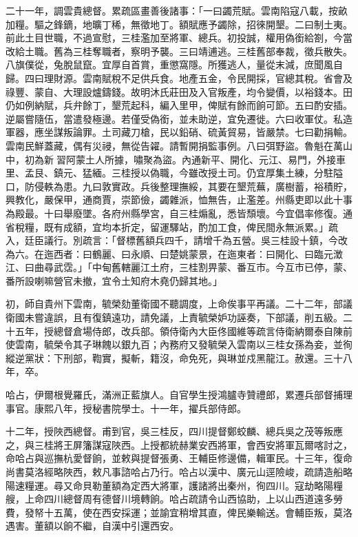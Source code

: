 \begin{pinyinscope}
二十一年，調雲貴總督。累疏區畫善後諸事：「一曰蠲荒賦。雲南陷寇八載，按畝加糧。驅之鋒鏑，地曠丁稀，無徵地丁。額賦應予蠲除，招徠開墾。二曰制土夷。前此土目世職，不過宣慰，三桂濫加至將軍、總兵。初投誠，權用偽銜給劄，今當改給土職。舊為三桂奪職者，察明予襲。三曰靖逋逃。三桂舊部奉裁，徵兵散失。八旗僕從，兔脫鼠竄。宜厚自首賞，重懲窩隱。所獲逃人，量從末減，庶聞風自歸。四曰理財源。雲南賦稅不足供兵食。地產五金，令民開採，官總其稅。省會及祿豐、蒙自、大理設爐鑄錢。故明沐氏莊田及入官叛產，均令變價，以裕錢本。田仍如例納賦，兵弁餘丁，墾荒起科，編入里甲，俾賦有餘而餉可節。五曰酌安插。逆屬嘗隨伍，當遣發極邊。若僅受偽銜，並未助逆，宜免遷徙。六曰收軍仗。私造軍器，應坐謀叛論罪。土司藏刀槍，民以鉛硝、硫黃貿易，皆嚴禁。七曰勸捐輸。雲南民鮮蓋藏，偶有災祲，無從告糴。請暫開捐監事例。八曰弭野盜。魯魁在萬山中，初為新習阿蒙土人所據，嘯聚為盜。內通新平、開化、元江、易門，外接車里、孟艮、鎮元、猛緬。三桂授以偽職，今雖改授土司。仍宜厚集土練，分駐隘口，防侵軼為患。九曰敦實政。兵後整理撫綏，其要在墾荒蕪，廣樹蓄，裕積貯，興教化，嚴保甲，通商賈，崇節儉，蠲雜派，恤無告，止濫差。州縣吏即以此十事為殿最。十曰舉廢墜。各府州縣學宮，自三桂煽亂，悉皆頹壞。今宜倡率修復。通省稅糧，既有成額，宜均本折定，留運驛站，酌加工食，俾民間永無派累。」疏入，廷臣議行。別疏言：「督標舊額兵四千，請增千為五營。吳三桂設十鎮，今改為六。在迤西者：曰鶴麗、曰永順、曰楚姚蒙景，在迤東者：曰開化、曰臨元澂江、曰曲尋武霑。」「中甸舊轄麗江土府，三桂割畀蒙、番互市。今互市已停，蒙、番所設喇嘛營官未撤，宜令土知府木堯仍歸其地。」

初，師自貴州下雲南，毓榮劾董衛國不聽調度，上命俟事平再議。二十二年，部議衛國未嘗違誤，且有復鎮遠功，請免議，上責毓榮妒功誣奏，下部議，削五級。二十五年，授總督倉場侍郎，改兵部。領侍衛內大臣佟國維等疏言侍衛納爾泰自陳前使雲南，毓榮令其子琳餽以銀九百；內務府又發毓榮入雲南以三桂女孫為妾，並徇縱逆黨狀：下刑部，鞫實，擬斬，籍沒，命免死，與琳並戍黑龍江。赦還。三十八年，卒。

哈占，伊爾根覺羅氏，滿洲正藍旗人。自官學生授鴻臚寺贊禮郎，累遷兵部督捕理事官。康熙八年，授秘書院學士。十一年，擢兵部侍郎。

十二年，授陜西總督。甫到官，吳三桂反，四川提督鄭蛟麟、總兵吳之茂等叛應之，與三桂將王屏籓謀寇陜西。上授都統赫業安西將軍，會西安將軍瓦爾喀討之，命哈占與巡撫杭愛督餉，並敕與提督張勇、王輔臣修邊備，輯軍民。十三年，復命尚書莫洛經略陜西，敕凡事諮哈占乃行。哈占以漢中、廣元山逕險峻，疏請造船略陽速糧運。尋又命貝勒董額為定西大將軍，護諸將出秦州，徇四川。寇劫略陽糧艘，上命四川總督周有德督川境轉餉。哈占疏請令山西協助，上以山西道遠多勞費，發帑十五萬，使在西安採運；並諭宜稍增其直，俾民樂輸送。會輔臣叛，莫洛遇害。董額以餉不繼，自漢中引還西安。


\end{pinyinscope}
